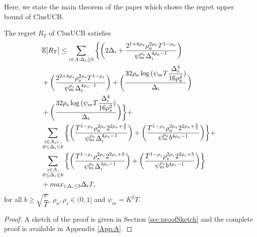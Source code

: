 	
	Here, we state the main theorem of the paper which shows the regret upper bound of ClusUCB.
	
\begin{theorem}
\label{Result:Theorem:1}
The regret $R_T$ of ClusUCB satisfies
\begin{align*}
&\mathbb{E} [R_{T}]\leq 
\sum\limits_{i\in A:\Delta_{i}\geq b} \bigg\lbrace \bigg(2\Delta_{i}+\dfrac{2^{1+4\rho_{a}}\rho_{a}^{2\rho_{a}}T^{1-\rho_{a}}}{\psi_{m}^{\rho_{a}}\Delta_{i}^{4\rho_{a}-1}}\bigg) \\
&+ \bigg(\dfrac{2^{2+4\rho_{s}}\rho_{s}^{2\rho_{s}}T^{1-\rho_{s}}}{\psi_{m}^{\rho_{s}}\Delta_{i}^{4\rho_{s}-1}}\bigg) + \bigg(\dfrac{32\rho_{a}\log{(\psi_{m}T\dfrac{\Delta_{i}^{4}}{16\rho_{a}^{2}})}}{\Delta_{i}}\bigg)\\
& + \bigg(\dfrac{32\rho_{s}\log{(\psi_{m}T\dfrac{\Delta_{i}^{4}}{16\rho_{s}^{2}})}}{\Delta_{i}}\bigg)\bigg\rbrace + \\
&
\sum\limits_{\substack{i\in A_{s^{*}},\\0\leq\Delta_{i}\leq b}}\bigg\lbrace \bigg(\dfrac{T^{1-\rho_{a}}\rho_{a}^{2\rho_{a}}2^{2\rho_{a}+\frac{3}{2}}}{\psi_{m}^{\rho_{a}}\Delta_{i}^{4\rho_{a}-1}} \bigg)+\bigg(\dfrac{T^{1-\rho_{a}}\rho_{a}^{2\rho_{a}}2^{2\rho_{a}+\frac{3}{2}}}{\psi_{m}^{\rho_{a}}b^{4\rho_{a} -1}} \bigg)\bigg\rbrace + \\
&\sum\limits_{\substack{i\in A,\\0\leq\Delta_{i}\leq b}}\bigg\lbrace  \bigg(\dfrac{T^{1-\rho_{s}}\rho_{s}^{2\rho_{s}}2^{2\rho_{s}+3}}{\psi_{m}^{\rho_{s}}\Delta_{i}^{4\rho_{s}-1}} \bigg)+\bigg(\dfrac{T^{1-\rho_{s}}\rho_{s}^{2\rho_{s}}2^{2\rho_{s}+3}}{\psi_{m}^{\rho_{s}}b^{4\rho_{s} -1}} \bigg) \bigg\rbrace \\
&+ max_{i:\Delta_{i}\leq b}\Delta_{i}T, 
\end{align*}
for all $b\geq \sqrt{\dfrac{e}{T}}$, $\rho_{a},\rho_{s}\in (0,1]$ and $\psi_{m}=K^{2}T$.
\end{theorem}
\begin{proof}
 A sketch of the proof is given in Section \ref{sec:proofSketch} and the complete proof is available in Appendix \ref{App:A}.
\end{proof}

	
	

